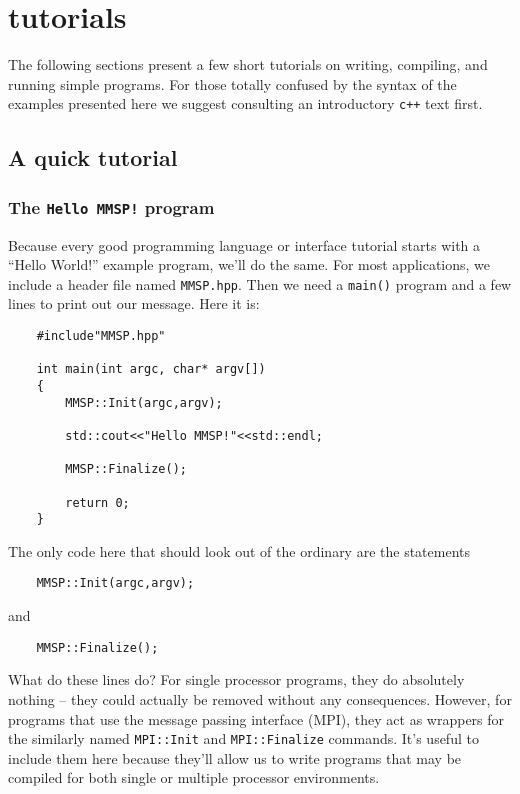 
\chapter{\MMSP tutorials}
The following sections present a few short tutorials on writing, compiling, and running simple \MMSP programs.  For those totally confused by the syntax of the examples presented here we suggest consulting an introductory {\tt c++} text first.

\section{A quick tutorial}
\subsection{The {\tt Hello MMSP!} program}
Because every good programming language or interface tutorial starts with a ``Hello World!'' example program, we'll do the same.  For most \MMSP applications, we include a header file named {\tt MMSP.hpp}.  Then we need a {\tt main()} program and a few lines to print out our message.  Here it is:
\begin{shadebox}
\begin{verbatim}
    #include"MMSP.hpp"

    int main(int argc, char* argv[])
    {
        MMSP::Init(argc,argv);

        std::cout<<"Hello MMSP!"<<std::endl;

        MMSP::Finalize();
        
        return 0;
    }
\end{verbatim}
\end{shadebox}
The only code here that should look out of the ordinary are the statements
\begin{shadebox}
\begin{verbatim}
    MMSP::Init(argc,argv);
\end{verbatim}
\end{shadebox}
and
\begin{shadebox}
\begin{verbatim}
    MMSP::Finalize();
\end{verbatim}
\end{shadebox}
What do these lines do?  For single processor programs, they do absolutely nothing -- they could actually be removed without any consequences.  However, for programs that use the message passing interface (MPI), they act as wrappers for the similarly named {\tt MPI::Init} and {\tt MPI::Finalize} commands.  It's useful to include them here because they'll allow us to write programs that may be compiled for both single or multiple processor environments.

